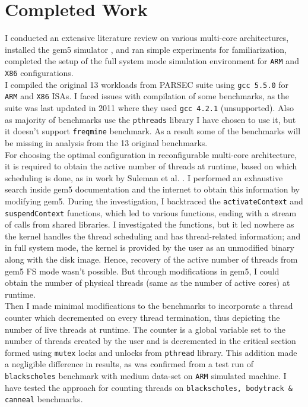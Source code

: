\documentclass[a4paper,12pt, final]{report}
\begin{document}
\section{Completed Work}
I conducted an extensive literature review on various multi-core architectures, installed the gem5 simulator \cite{gem5}, and ran simple experiments for familiarization, completed the setup of the full system mode simulation environment for \texttt{ARM} and \texttt{X86} configurations. \\
\indent I compiled the original 13 workloads from PARSEC \cite{parsec} suite using \texttt{gcc 5.5.0} for \texttt{ARM} and \texttt{X86} ISAs. I faced issues with compilation of some benchmarks, as the suite was last updated in 2011 where they used \texttt{gcc 4.2.1} (unsupported). Also as majority of benchmarks use the \texttt{pthreads} library I have chosen to use it, but it doesn't support \texttt{freqmine} benchmark. As a result some of the benchmarks will be missing in analysis from the 13 original benchmarks. \\ 
\indent For choosing the optimal configuration in reconfigurable multi-core architecture, it is required to obtain the active number of threads at runtime, based on which scheduling is done, as in work by Suleman et al. \cite{suleman2012morphcore}. I performed an exhaustive search inside gem5 documentation and the internet to obtain this information by modifying gem5. During the investigation, I backtraced the \texttt{activateContext} and \texttt{suspendContext} functions, which led to various functions, ending with a stream of calls from shared libraries. I investigated the functions, but it led nowhere as the kernel handles the thread scheduling and has thread-related information; and in full system mode, the kernel is provided by the user as an unmodified binary along with the disk image. Hence, recovery of the active number of threads from gem5 FS mode wasn’t possible. But through modifications in gem5, I could obtain the number of physical threads (same as the number of active cores) at runtime.  \\
\indent Then I made minimal modifications to the benchmarks to incorporate a thread counter which decremented on every thread termination, thus depicting the number of live threads at runtime. The counter is a global variable set to the number of threads created by the user and is decremented in the critical section formed using \texttt{mutex} locks and unlocks from \texttt{pthread} library. This addition made a negligible difference in results, as was confirmed from a test run of \texttt{blackscholes} benchmark with medium data-set on \texttt{ARM} simulated machine. I have tested the approach for counting threads on \texttt{blackscholes, bodytrack \& canneal} benchmarks. \\
\end{document}
